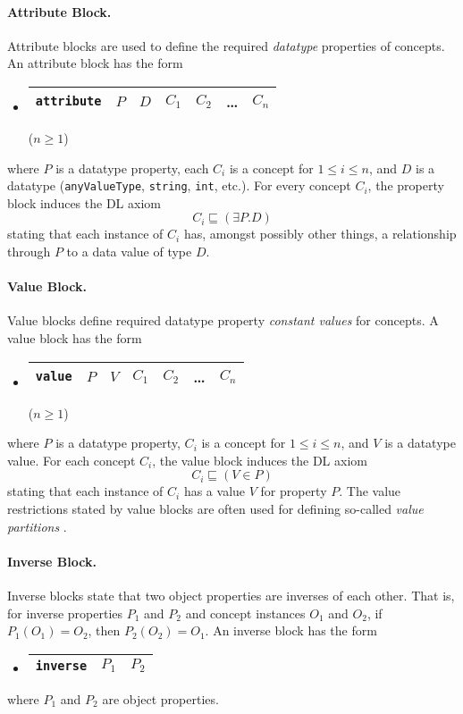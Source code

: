 \documentclass[preprint,number]{elsarticle}
\begin{document}
\paragraph{Attribute Block.} Attribute blocks are used to define the
required \emph{datatype} properties of concepts. An attribute block
has the form
\begin{itemize}
\item[]
  \begin{tabular}{|l|l|l|l|l|l|l|}\hline \texttt{attribute} & $P$ & $D$ & $C_1$
    & $C_2$ & \dots & $C_n$ \\ \hline
  \end{tabular} \hfill ($n \ge 1$)
\end{itemize}
where $P$ is a datatype property, each $C_i$ is a concept for $1 \le i
\le n$, and $D$ is a datatype (\texttt{anyValueType}, \texttt{string},
\texttt{int}, etc.). For every concept $C_i$, the property block
induces the DL axiom \[C_i \sqsubseteq (\exists P . D)\] stating that
each instance of $C_i$ has, amongst possibly other things, a
relationship through $P$ to a data value of type $D$.


\paragraph{Value Block.} Value blocks define required datatype
property \emph{constant values} for concepts. A value block has the
form
\begin{itemize}
\item[]
  \begin{tabular}{|l|l|l|l|l|l|l|}\hline \texttt{value} & $P$ & $V$ & $C_1$
    & $C_2$ & \dots & $C_n$ \\ \hline
  \end{tabular} \hfill ($n \ge 1$)
\end{itemize}
where $P$ is a datatype property, $C_i$ is a concept for $1 \le i \le
n$, and $V$ is a datatype value. For each concept $C_i$, the value
block induces the DL axiom \[C_i \sqsubseteq (V \in P)\] stating that
each instance of $C_i$ has a value $V$ for property $P$.  The value
restrictions stated by value blocks are often used for defining
so-called \emph{value partitions} \cite{co-ode}.

\paragraph{Inverse Block.} Inverse blocks state that two object
properties are inverses of each other. That is, for inverse properties
$P_1$ and $P_2$ and concept instances $O_1$ and $O_2$, if $P_1(O_1) =
O_2$, then $P_2(O_2) = O_1$.  An inverse block has the form
\begin{itemize}
\item[]
  \begin{tabular}{|l|l|l|}\hline \texttt{inverse} & $P_1$ & $P_2$
\\ \hline
  \end{tabular}
\end{itemize}
where $P_1$ and $P_2$ are object properties. 
\end{document}
